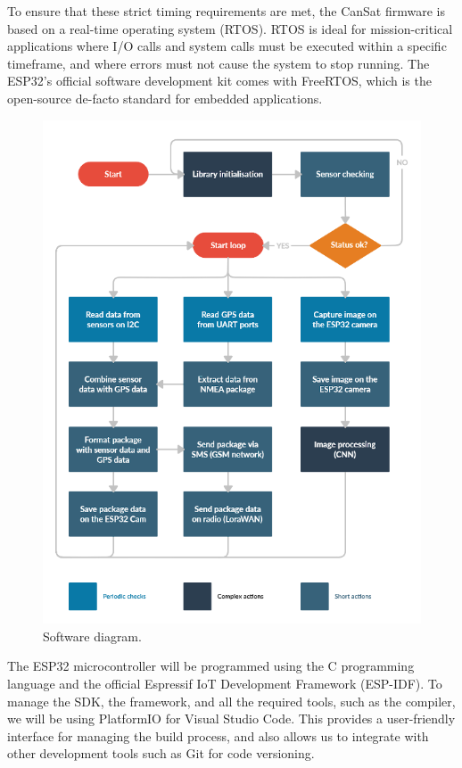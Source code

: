 \documentclass[11pt]{article}
\begin{document}
To ensure that these strict timing requirements are met, the CanSat firmware is based on a real-time operating system (RTOS). RTOS is ideal for mission-critical applications where I/O calls and system calls must be executed within a specific timeframe, and where errors must not cause the system to stop running. The ESP32's official software development kit comes with FreeRTOS, which is the open-source de-facto standard for embedded applications.

\begin{figure}[htbp]
    \centering
    \includegraphics[width=12.7cm]{images/img_Code_Blocks.png}
    \caption{\small{Software diagram.}}
    \label{fig:codeblocks}
\end{figure}


The ESP32 microcontroller will be programmed using the C programming language and the official Espressif IoT Development Framework (ESP-IDF). To manage the SDK, the framework, and all the required tools, such as the compiler, we will be using PlatformIO for Visual Studio Code. This provides a user-friendly interface for managing the build process, and also allows us to integrate with other development tools such as Git for code versioning.
\end{document}
